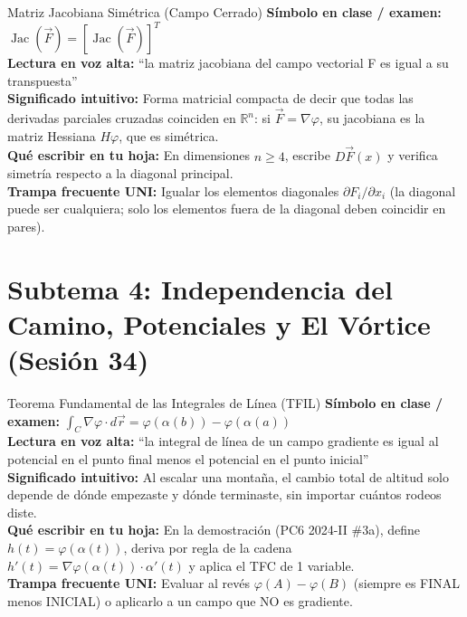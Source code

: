 \documentclass[11pt,a4paper]{article}
\begin{document}
\begin{definicionbox}{Matriz Jacobiana Simétrica (Campo Cerrado)}
\textbf{Símbolo en clase / examen:} $\operatorname{Jac}(\vec{F}) = [\operatorname{Jac}(\vec{F})]^T$\\[0.15cm]
\textbf{Lectura en voz alta:} ``la matriz jacobiana del campo vectorial F es igual a su transpuesta''\\[0.12cm]
\textbf{Significado intuitivo:} Forma matricial compacta de decir que todas las derivadas parciales cruzadas coinciden en $\mathbb{R}^n$: si $\vec{F}=\nabla\varphi$, su jacobiana es la matriz Hessiana $H\varphi$, que es simétrica.\\[0.12cm]
\textbf{Qué escribir en tu hoja:} En dimensiones $n \ge 4$, escribe $D\vec{F}(x)$ y verifica simetría respecto a la diagonal principal.\\[0.12cm]
\textbf{Trampa frecuente UNI:} Igualar los elementos diagonales $\partial F_i / \partial x_i$ (la diagonal puede ser cualquiera; solo los elementos fuera de la diagonal deben coincidir en pares).
\end{definicionbox}

\section{Subtema 4: Independencia del Camino, Potenciales y El Vórtice (Sesión 34)}

\begin{definicionbox}{Teorema Fundamental de las Integrales de Línea (TFIL)}
\textbf{Símbolo en clase / examen:} $\int_C \nabla \varphi \cdot d\vec{r} = \varphi(\alpha(b)) - \varphi(\alpha(a))$\\[0.15cm]
\textbf{Lectura en voz alta:} ``la integral de línea de un campo gradiente es igual al potencial en el punto final menos el potencial en el punto inicial''\\[0.12cm]
\textbf{Significado intuitivo:} Al escalar una montaña, el cambio total de altitud solo depende de dónde empezaste y dónde terminaste, sin importar cuántos rodeos diste.\\[0.12cm]
\textbf{Qué escribir en tu hoja:} En la demostración (PC6 2024-II \#3a), define $h(t) = \varphi(\alpha(t))$, deriva por regla de la cadena $h'(t) = \nabla\varphi(\alpha(t))\cdot\alpha'(t)$ y aplica el TFC de 1 variable.\\[0.12cm]
\textbf{Trampa frecuente UNI:} Evaluar al revés $\varphi(A) - \varphi(B)$ (siempre es FINAL menos INICIAL) o aplicarlo a un campo que NO es gradiente.
\end{definicionbox}
\end{document}
